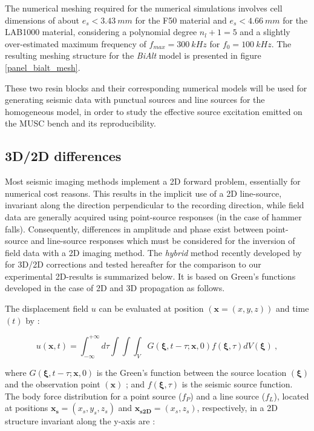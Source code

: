 \documentclass[paper,extra]{gji} %
\newcommand{\bialt}{\textit{BiAlt} }
\begin{document}
\noindent The numerical meshing required for the numerical simulations involves cell dimensions of about $e_{s}<3.43\ mm$ for the F50 material and $e_{s}<4.66\ mm$ for the LAB1000 material, considering a polynomial degree $n_{l}+1=5$ and a slightly over-estimated maximum frequency of $f_{max}=300\ kHz$ for $f_{0}=100\ kHz$. The resulting meshing structure for the \bialt model is presented in figure \ref{panel_bialt_mesh}.

\noindent These two resin blocks and their corresponding numerical models will be used for generating seismic data with punctual sources and line sources for the homogeneous model, in order to study the effective source excitation emitted on the MUSC bench and its reproducibility.

\subsection{3D/2D differences}

\noindent Most seismic imaging methods implement a 2D forward problem, essentially for numerical cost reasons. This results in the implicit use of a 2D line-source, invariant along the direction perpendicular to the recording direction, while field data are generally acquired using point-source responses (in the case of hammer falls). Consequently, differences in amplitude and phase exist between point-source and line-source responses which must be considered for the inversion of field data with a 2D imaging method. The \textit{hybrid} method recently developed by \citet{Forbriger_LSS_2014} for 3D/2D corrections and tested hereafter for the comparison to our experimental 2D-results is summarized below. It is based on Green's functions developed in the case of 2D and 3D propagation as follows.

\noindent The displacement field $u$ can be evaluated at position $(\mathbf{x}=(x,y,z))$ and time $(t)$ by \citep{aki2002quantitative}:

\begin{equation}
u(\mathbf{x},t) = \int_{-\infty}^{+\infty}d\tau \int \int \int_{V} G(\mathbf{\xi},t-\tau;\mathbf{x},0)f(\mathbf{\xi},\tau)dV(\mathbf{\xi})\ ,
\label{eq:displacement}
\end{equation}

\noindent where $G(\mathbf{\xi},t-\tau;\mathbf{x},0)$ is the Green's function between the source location $(\mathbf{\xi})$ and the observation point $(\mathbf{x})$ ; and $f(\mathbf{\xi},\tau)$ is the seismic source function. The body force distribution for a point source ($f_{P}$) and a line source ($f_{L}$), located at positions $ \mathbf{x_{s}}=(x_{s}, y_{s},z_{s}) $ and $ \mathbf{x_{s2D}}=(x_{s},z_{s}) $, respectively, in a 2D structure invariant along the y-axis are :
\end{document}
